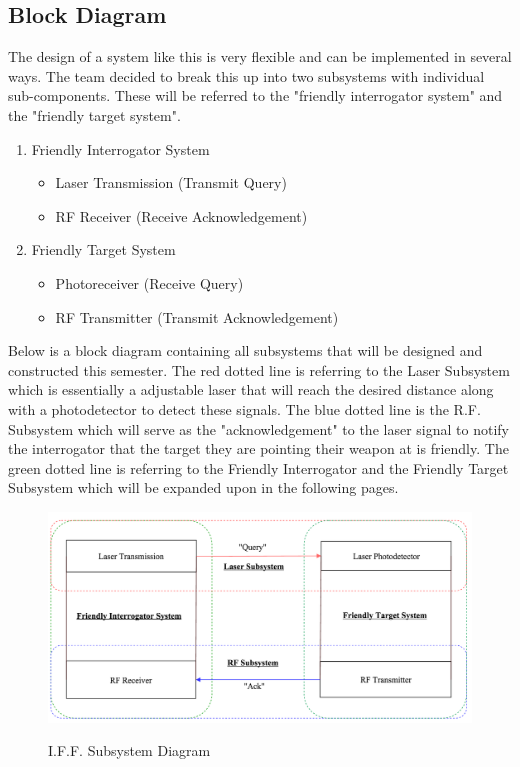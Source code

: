 \documentclass[openbib,letterpaper,10pt]{article}
\begin{document}
\begin{spacing}{1.15}
\subsection{Block Diagram}
The design of a system like this is very flexible and can be implemented in several ways. The team decided to break this up into two subsystems with individual sub-components. These will be referred to the "friendly interrogator system" and the "friendly target system". 
\begin{enumerate}
	\item Friendly Interrogator System
	\begin{itemize}
		\item Laser Transmission (Transmit Query)
		\item RF Receiver (Receive Acknowledgement)
	\end{itemize}
	\item Friendly Target System
	\begin{itemize}
		\item Photoreceiver (Receive Query)
		\item RF Transmitter (Transmit Acknowledgement)
	\end{itemize}
\end{enumerate}

Below is a block diagram containing all subsystems that will be designed and constructed this semester. The red dotted line is referring to the Laser Subsystem which is essentially a adjustable laser that will reach the desired distance along with a photodetector to detect these signals. The blue dotted line is the R.F. Subsystem which will serve as the "acknowledgement" to the laser signal to notify the interrogator that the target they are pointing their weapon at is friendly. The green dotted line is referring to the Friendly Interrogator and the Friendly Target Subsystem which will be expanded upon in the following pages.


\begin{figure} [H]
	\centering
	\includegraphics[scale=0.5]{System_Diagram.png}
	\label{fig:system-diagram}
	\caption{I.F.F. Subsystem Diagram}
\end{figure}
\clearpage


\end{spacing}
\end{document}
